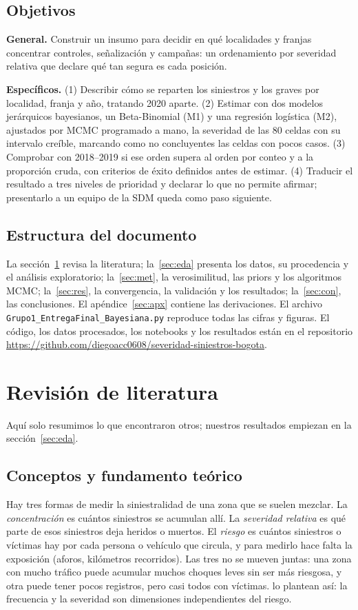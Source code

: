 \documentclass[10pt,twocolumn]{article}
\begin{document}
\subsection{Objetivos}
\textbf{General.} Construir un insumo para decidir en qué localidades y franjas concentrar controles, señalización y campañas: un ordenamiento por severidad relativa que declare qué tan segura es cada posición.

\textbf{Específicos.} (1) Describir cómo se reparten los siniestros y los graves por localidad, franja y año, tratando 2020 aparte. (2) Estimar con dos modelos jerárquicos bayesianos, un Beta-Binomial (M1) y una regresión logística (M2), ajustados por MCMC programado a mano, la severidad de las 80 celdas con su intervalo creíble, marcando como no concluyentes las celdas con pocos casos. (3) Comprobar con 2018--2019 si ese orden supera al orden por conteo y a la proporción cruda, con criterios de éxito definidos antes de estimar. (4) Traducir el resultado a tres niveles de prioridad y declarar lo que no permite afirmar; presentarlo a un equipo de la SDM queda como paso siguiente.

\subsection{Estructura del documento}\label{sec:estructura}
La sección~\ref{sec:lit} revisa la literatura; la~\ref{sec:eda} presenta los datos, su procedencia y el análisis exploratorio; la~\ref{sec:met}, la verosimilitud, las priors y los algoritmos MCMC; la~\ref{sec:res}, la convergencia, la validación y los resultados; la~\ref{sec:con}, las conclusiones. El apéndice~\ref{sec:apx} contiene las derivaciones. El archivo \texttt{Grupo1\_EntregaFinal\_Bayesiana.py} reproduce todas las cifras y figuras. El código, los datos procesados, los notebooks y los resultados están en el repositorio \url{https://github.com/diegoacc0608/severidad-siniestros-bogota}.

\section{Revisión de literatura}\label{sec:lit}
Aquí solo resumimos lo que encontraron otros; nuestros resultados empiezan en la sección~\ref{sec:eda}.

\subsection{Conceptos y fundamento teórico}
Hay tres formas de medir la siniestralidad de una zona que se suelen mezclar. La \emph{concentración} es cuántos siniestros se acumulan allí. La \emph{severidad relativa} es qué parte de esos siniestros deja heridos o muertos. El \emph{riesgo} es cuántos siniestros o víctimas hay por cada persona o vehículo que circula, y para medirlo hace falta la exposición (aforos, kilómetros recorridos). Las tres no se mueven juntas: una zona con mucho tráfico puede acumular muchos choques leves sin ser más riesgosa, y otra puede tener pocos registros, pero casi todos con víctimas. \citet{stipancic2019network} lo plantean así: la frecuencia y la severidad son dimensiones independientes del riesgo.
\end{document}
